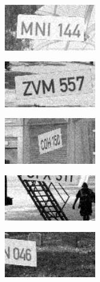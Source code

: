 \documentclass{VUMIFInfBakalaurinis}
\begin{document}
\begin{figure}[ht!]
\begin{subfigure}{\linewidth}
  \centering
  \includegraphics[width=4cm]{train_images/1_good.png}
\end{subfigure}

\begin{subfigure}{\linewidth}
  \centering
  \includegraphics[width=4cm]{train_images/1_good2.png}
\end{subfigure}

\begin{subfigure}{\linewidth}
  \centering
  \includegraphics[width=4cm]{train_images/0_small.png}
\end{subfigure}

\begin{subfigure}{\linewidth}
  \centering
  \includegraphics[width=4cm]{train_images/0_truncated.png}
\end{subfigure}

\begin{subfigure}{\linewidth}
  \centering
  \includegraphics[width=4cm]{train_images/0_truncated2.png}
\end{subfigure}


\end{figure}
\end{document}
